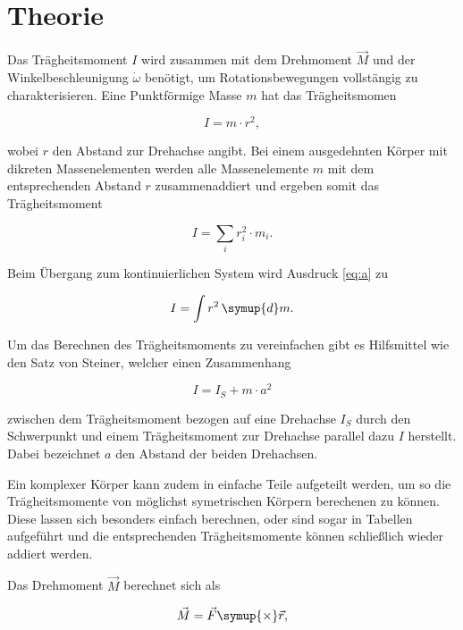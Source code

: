 \section{Theorie}
\label{sec:Theorie}

Das Trägheitsmoment $I$ wird zusammen mit dem
Drehmoment $\vec{M}$ und der Winkelbeschleunigung $\dot{\omega}$
benötigt, um Rotationsbewegungen vollstängig zu charakterisieren.
Eine Punktförmige Masse $m$ hat das Trägheitsmomen

\begin{equation}
    I=m \cdot r^2,
\end{equation}

\noindent wobei $r$ den Abstand zur Drehachse angibt.
Bei einem ausgedehnten Körper mit dikreten Massenelementen 
werden alle Massenelemente $m$ 
mit dem entsprechenden Abstand $r$ zusammenaddiert und 
ergeben somit das Trägheitsmoment

\begin{equation}
    I=\sum_i r_i^2 \cdot m_i.
    \label{eq:a}
\end{equation}

\noindent Beim Übergang zum kontinuierlichen System wird 
Ausdruck \ref{eq:a} zu

\begin{equation}
    I=\int r^2 \, \symup{d}m.
\end{equation}

\noindent Um das Berechnen des Trägheitsmoments zu vereinfachen
gibt es Hilfsmittel wie den Satz von Steiner, welcher
einen Zusammenhang 

\begin{equation}
    I=I_S+m \cdot a^2
\end{equation}

\noindent zwischen dem Trägheitsmoment bezogen auf eine
Drehachse $I_S$ durch den Schwerpunkt und einem Trägheitsmoment
zur Drehachse parallel dazu $I$ herstellt. Dabei bezeichnet $a$
den Abstand der beiden Drehachsen.

Ein komplexer Körper kann zudem in einfache Teile aufgeteilt werden, um
so die Trägheitsmomente von möglichst symetrischen Körpern berechenen
zu können. Diese lassen sich besonders einfach berechnen, oder
sind sogar in Tabellen aufgeführt und die 
entsprechenden Trägheitsmomente können schließlich wieder addiert werden.

Das Drehmoment $\vec{M}$ berechnet sich als

\begin{equation}
    \vec{M}=\vec{F} \symup{\times} \vec{r},
\end{equation}

